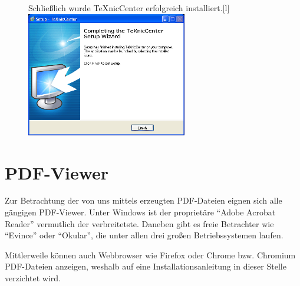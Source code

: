 \begin{figure}[thb]
	\begin{captionbeside}{Schließlich wurde TeXnicCenter erfolgreich installiert.}[l]
		\includegraphics[width=7cm]{images/TeXnicCenter-install-08.png}
	\end{captionbeside}
	\label{fig:install27}
\end{figure}


\clearpage %


\section{PDF-Viewer}

Zur Betrachtung der von uns mittels \DMLLaTeX{} erzeugten PDF-Dateien eignen sich alle gängigen PDF-Viewer. Unter Windows ist der proprietäre \enquote{Adobe Acrobat Reader} vermutlich der verbreitetste. Daneben gibt es freie Betrachter wie \enquote{Evince} oder \enquote{Okular}, die unter allen drei großen Betriebssystemen laufen. 

Mittlerweile können auch Webbrowser wie Firefox oder Chrome bzw. Chromium PDF-Dateien anzeigen, weshalb auf eine Installationsanleitung in dieser Stelle verzichtet wird.

